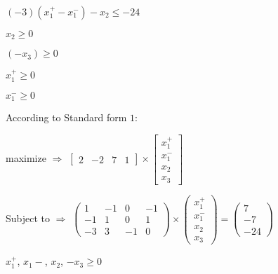 \documentclass[letterpaper,11pt]{article}
\begin{document}
\tabto{58pt} $(-3)(x_1^{+} - x_1^{-}) - x_2 \leq -24$

\tabto{58pt} $x_2 \geq 0$

\tabto{58pt} $(-x_3) \geq 0$

\tabto{58pt} $x_1^{+} \geq 0$

\tabto{58pt} $x_1^{-} \geq 0$

According to Standard form $1$:

maximize $\Rightarrow$
$
    \begin{bmatrix}
        2 & -2 & 7 & 1
    \end{bmatrix}
       \times
    \begin{bmatrix}
       x_1^{+}\\
       x_1^{-}\\
       x_2\\
       x_3
    \end{bmatrix}
$

Subject to $\Rightarrow$
$
     \begin{pmatrix}
        1 & -1 & 0 & -1\\ 
        -1 & 1 & 0 & 1\\
        -3 & 3 & -1 & 0
     \end{pmatrix}
     \times
     \begin{pmatrix}
        x_1^{+}\\
        x_1^{-}\\
        x_2\\
        x_3
     \end{pmatrix}
      =
     \begin{pmatrix}
         7\\ 
         -7\\
         -24
     \end{pmatrix}
  $

  $x_1^{+}$, $x_1{-}$, $x_2$, $-x_3 \geq 0$
\end{document}
